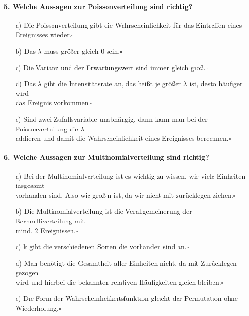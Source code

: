 \documentclass[a4paper]{article}
\begin{document}
\paragraph{5. Welche Aussagen zur Poissonverteilung sind richtig?}
\begin{itemize}
    \item[a)]Die Poissonverteilung gibt die Wahrscheinlichkeit für das Eintreffen eines \\Ereignisses wieder.\hfill $\square$
    \item[b)]Das $\lambda$ muss größer gleich 0 sein.\hfill $\square$
    \item[c)]Die Varianz und der Erwartungswert sind immer gleich groß.\hfill $\square$
    \item[d)]Das $\lambda$ gibt die Intensitätsrate an, das heißt je größer $\lambda$ ist, desto häufiger wird \\das Ereignis vorkommen.\hfill $\square$
    \item[e)]Sind zwei Zufallsvariable unabhängig, dann kann man bei der Poissonverteilung die $\lambda$\\ addieren und damit die Wahrscheinlichkeit eines Ereignisses berechnen.\hfill $\square$
\end{itemize}

\paragraph{6. Welche Aussagen zur Multinomialverteilung sind richtig?}
\begin{itemize}
    \item[a)] Bei der Multinomialverteilung ist es wichtig zu wissen, wie viele Einheiten insgesamt\\ vorhanden sind. Also wie groß n ist, da wir nicht mit zurücklegen ziehen.\hfill $\square$
    \item[b)]Die Multinomialverteilung ist die Verallgemeinerung der Bernoulliverteilung mit\\ mind. 2 Ereignissen.\hfill $\square$
    \item[c)]k gibt die verschiedenen Sorten die vorhanden sind an.\hfill $\square$
    \item[d)]Man benötigt die Gesamtheit aller Einheiten nicht, da mit Zurücklegen gezogen\\ wird und hierbei die bekannten relativen Häufigkeiten gleich bleiben.\hfill $\square$
    \item[e)]Die Form der Wahrscheinlichkeitsfunktion gleicht der Permutation ohne Wiederholung.\hfill $\square$
\end{itemize}
\clearpage
\end{document}
